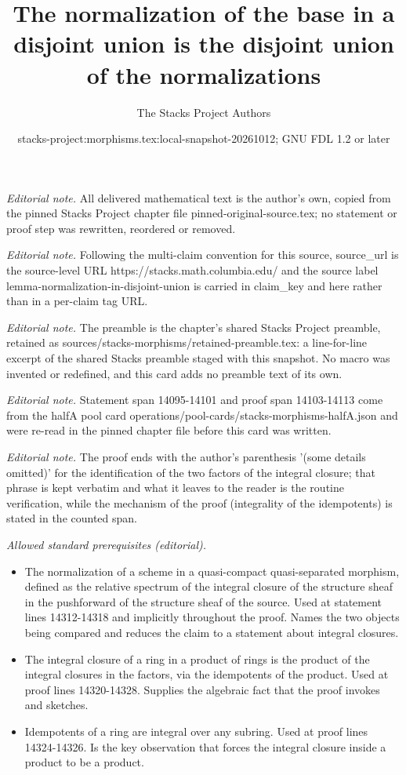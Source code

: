 \documentclass[10pt,a4paper]{amsart}
\title{The normalization of the base in a disjoint union is the disjoint union of the normalizations}
\author{The Stacks Project Authors}
\date{stacks-project:morphisms.tex:local-snapshot-20261012; GNU FDL 1.2 or later}
\theoremstyle{plain}
\theoremstyle{definition}
\theoremstyle{remark}
\numberwithin{equation}{subsection}
\begin{document}
\maketitle
\noindent\textit{Editorial note.} All delivered mathematical text is the author's own, copied from the pinned Stacks Project chapter file pinned-original-source.tex; no statement or proof step was rewritten, reordered or removed.\par\medskip
\noindent\textit{Editorial note.} Following the multi-claim convention for this source, source\_url is the source-level URL https://stacks.math.columbia.edu/ and the source label lemma-normalization-in-disjoint-union is carried in claim\_key and here rather than in a per-claim tag URL.\par\medskip
\noindent\textit{Editorial note.} The preamble is the chapter's shared Stacks Project preamble, retained as sources/stacks-morphisms/retained-preamble.tex: a line-for-line excerpt of the shared Stacks preamble staged with this snapshot. No macro was invented or redefined, and this card adds no preamble text of its own.\par\medskip
\noindent\textit{Editorial note.} Statement span 14095-14101 and proof span 14103-14113 come from the halfA pool card operations/pool-cards/stacks-morphisms-halfA.json and were re-read in the pinned chapter file before this card was written.\par\medskip
\noindent\textit{Editorial note.} The proof ends with the author's parenthesis '(some details omitted)' for the identification of the two factors of the integral closure; that phrase is kept verbatim and what it leaves to the reader is the routine verification, while the mechanism of the proof (integrality of the idempotents) is stated in the counted span.\par\medskip
\noindent\textit{Allowed standard prerequisites (editorial).}\begin{itemize}
\item The normalization of a scheme in a quasi-compact quasi-separated morphism, defined as the relative spectrum of the integral closure of the structure sheaf in the pushforward of the structure sheaf of the source. Used at statement lines 14312-14318 and implicitly throughout the proof. Names the two objects being compared and reduces the claim to a statement about integral closures.
\item The integral closure of a ring in a product of rings is the product of the integral closures in the factors, via the idempotents of the product. Used at proof lines 14320-14328. Supplies the algebraic fact that the proof invokes and sketches.
\item Idempotents of a ring are integral over any subring. Used at proof lines 14324-14326. Is the key observation that forces the integral closure inside a product to be a product.
\end{itemize}\medskip
\end{document}
